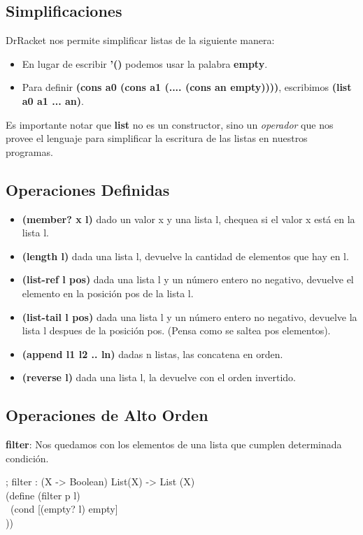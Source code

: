 \documentclass[11pt,a4paper]{article}
\begin{document}
\subsection{Simplificaciones}
DrRacket nos permite simplificar listas de la siguiente manera:
\begin{itemize}
\item En lugar de escribir \textbf{'()} podemos usar la palabra \textbf{empty}.

\item Para definir \textbf{(cons a0 (cons a1 (.... (cons an empty))))}, escribimos \textbf{(list a0 a1 ... an)}.
\end{itemize}
\noindent Es importante notar que \textbf{list} no es un constructor, sino un \textit{operador} que nos provee el lenguaje para simplificar la escritura de las listas en nuestros programas.

\subsection{Operaciones Definidas}
\begin{itemize}
\item \textbf{(member? x l)} dado un valor x y una lista l, chequea si el valor x está en la lista l.
\item \textbf{(length l)} dada una lista l, devuelve la cantidad de elementos que hay en l.
\item \textbf{(list-ref l pos)} dada una lista l y un n\'umero entero no negativo, devuelve el elemento en la posici\'on pos de la lista l.
\item \textbf{(list-tail l pos)} dada una lista l y un n\'umero entero no negativo, devuelve la lista l despues de la posici\'on pos. (Pensa como se saltea pos elementos).
\item \textbf{(append l1 l2 .. ln)} dadas n listas, las concatena en orden.
\item \textbf{(reverse l)} dada una lista l, la devuelve con el orden invertido.
\end{itemize}

\subsection{Operaciones de Alto Orden}
\textbf{filter}: Nos quedamos con los elementos de una lista que cumplen determinada condici\'on.
\begin{siderules}
; filter : (X -> Boolean) List(X) -> List (X)\\
(define (filter p l)\\
\indent \indent \indent \ (cond [(empty? l) empty]\\
\indent \indent \indent \indent {}))
\end{siderules}
\end{document}
